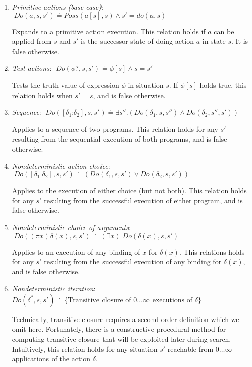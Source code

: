 \begin{enumerate}

\item \emph{Primitive actions (base case)}: $\; Do(a,s,s') \doteq Poss(a[s],s) \wedge s' = do(a,s)$

Expands to a primitive action execution. This relation holds if
$a$ can be applied from $s$ and $s'$ is the successor state of doing
action $a$ in state $s$.  It is false otherwise.

\item \emph{Test actions}: $\; Do(\phi?,s,s') \doteq \phi[s] \wedge s = s'$

Tests the truth value of expression $\phi$ in situation $s$.
If $\phi[s]$ holds true, this relation holds when $s' = s$,
and is false otherwise.

\item \emph{Sequence}: $\; Do([\delta_1 \textrm{;} \delta_2],s,s') \doteq \exists s''. (Do(\delta_1,s,s'') \wedge Do(\delta_2,s'',s'))$

Applies to a sequence of two programs.  This relation holds for
any $s'$ resulting from the sequential execution of both programs,
and is false otherwise.

\item \emph{Nondeterministic action choice}:  $\; Do([\delta_1 | \delta_2],s,s') \doteq (Do(\delta_1,s,s') \vee Do(\delta_2,s,s'))$

Applies to the execution of either choice (but not both).  This relation
holds for any $s'$ resulting from the successful execution of either
program, and is false otherwise.

\item \emph{Nondeterministic choice of arguments}: $\; Do((\pi x) \delta(x),s,s') \doteq (\exists x) \; Do(\delta(x),s,s')$

Applies to an execution of any binding of $x$ for $\delta(x)$.  This
relations holds for any $s'$ resulting from the successful execution
of any binding for $\delta(x)$, and is false otherwise.

\item \emph{Nondeterministic iteration}: $Do(\delta^*,s,s') \doteq \{ \textrm{Transitive closure of }0 \ldots \infty \textrm{ executions of }\delta \}$

Technically, transitive closure requires a second order definition which
we omit here.  Fortunately, there is a constructive procedural method for
computing transitive closure that will be exploited later during search.
Intuitively, this relation holds for any situation $s'$ reachable from $0 \ldots \infty$
applications of the action $\delta$.

\end{enumerate}

